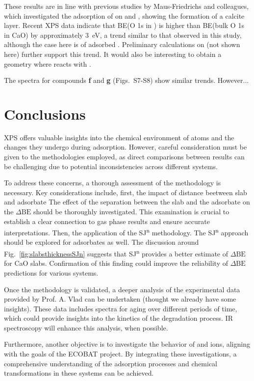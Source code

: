 \documentclass[journal=jpccck,manuscript=article]{achemso}
\def\dbe{\ensuremath{\Delta\text{BE}}}
\begin{document}

These results are in line with previous studies by Maus-Friedrichs and colleagues\cite{ochsCO2ChemisorptionCa1998,voigtsAdsorptionCO2CO2009,dahleSituPreparationCalcium2012}, which investigated the adsorption of  on  and , showing the formation of a calcite layer. Recent XPS data\cite{dahleSituPreparationCalcium2012} indicate that BE(O 1s in ) is higher than BE(bulk O 1s in CaO) by approximately \SI{3}{\electronvolt}, a trend similar to that observed in this study, although the case here is of adsorbed . Preliminary calculations on  (not shown here) further support this trend. It would also be interesting to obtain a geometry where  reacts with .

The spectra for compounds \textbf{f} and \textbf{g} (Figs.~S7-S8)  show similar trends. However...

\clearpage
\section{Conclusions}
XPS offers valuable insights into the chemical environment of atoms and the changes they undergo during adsorption. However, careful consideration must be given to the methodologies employed, as direct comparisons between results can be challenging due to potential inconsistencies across different systems.

To address these concerns, a thorough assessment of the methodology is necessary. Key considerations include, first, the impact of distance beetween slab and adsorbate The effect of the separation between the slab and the adsorbate on the \dbe{} should be thoroughly investigated. This examination is crucial to establish a clear connection to gas phase results and ensure accurate interpretations.
Then, the application of the SJ\textsuperscript{n} methodology. The SJ\textsuperscript{n} approach should be explored for adsorbates as well. The discussion around Fig.~\ref{fig:slabsthicknessSJn} suggests that SJ\textsuperscript{n} provides a better estimate of \dbe{} for CaO slabs. Confirmation of this finding could improve the reliability of \dbe{} predictions for various systems.

Once the methodology is validated, a deeper analysis of the experimental data provided by Prof. A. Vlad can be undertaken (thought we already have some insights). These data includes spectra for aging over different periods of time, which could provide insights into the kinetics of the degradation process. IR spectroscopy will enhance this analysis, when possible.

Furthermore, another objective is to investigate the behavior of  and  ions, aligning with the goals of the ECOBAT project. By integrating these investigations, a comprehensive understanding of the adsorption processes and chemical transformations in these systems can be achieved.


\clearpage

	
\end{document}
